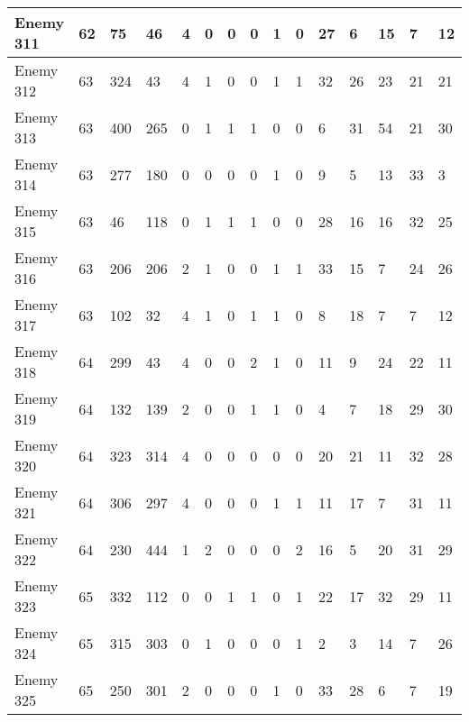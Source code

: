 \begin{sidewaystable}[!h]
{\begin{tabular}{|l|l|l|l|l|l|l|l|l|l|l|l|l|l|l|}
			Enemy 311 & 62 & 75 & 46 & 4 & 0 & 0 & 0 & 1 & 0 & 27 & 6 & 15 & 7 & 12 \\ \hline
			Enemy 312 & 63 & 324 & 43 & 4 & 1 & 0 & 0 & 1 & 1 & 32 & 26 & 23 & 21 & 21 \\ \hline
			Enemy 313 & 63 & 400 & 265 & 0 & 1 & 1 & 1 & 0 & 0 & 6 & 31 & 54 & 21 & 30 \\ \hline
			Enemy 314 & 63 & 277 & 180 & 0 & 0 & 0 & 0 & 1 & 0 & 9 & 5 & 13 & 33 & 3 \\ \hline
			Enemy 315 & 63 & 46 & 118 & 0 & 1 & 1 & 1 & 0 & 0 & 28 & 16 & 16 & 32 & 25 \\ \hline
			Enemy 316 & 63 & 206 & 206 & 2 & 1 & 0 & 0 & 1 & 1 & 33 & 15 & 7 & 24 & 26 \\ \hline
			Enemy 317 & 63 & 102 & 32 & 4 & 1 & 0 & 1 & 1 & 0 & 8 & 18 & 7 & 7 & 12 \\ \hline
			Enemy 318 & 64 & 299 & 43 & 4 & 0 & 0 & 2 & 1 & 0 & 11 & 9 & 24 & 22 & 11 \\ \hline
			Enemy 319 & 64 & 132 & 139 & 2 & 0 & 0 & 1 & 1 & 0 & 4 & 7 & 18 & 29 & 30 \\ \hline
			Enemy 320 & 64 & 323 & 314 & 4 & 0 & 0 & 0 & 0 & 0 & 20 & 21 & 11 & 32 & 28 \\ \hline
			Enemy 321 & 64 & 306 & 297 & 4 & 0 & 0 & 0 & 1 & 1 & 11 & 17 & 7 & 31 & 11 \\ \hline
			Enemy 322 & 64 & 230 & 444 & 1 & 2 & 0 & 0 & 0 & 2 & 16 & 5 & 20 & 31 & 29 \\ \hline
			Enemy 323 & 65 & 332 & 112 & 0 & 0 & 1 & 1 & 0 & 1 & 22 & 17 & 32 & 29 & 11 \\ \hline
			Enemy 324 & 65 & 315 & 303 & 0 & 1 & 0 & 0 & 0 & 1 & 2 & 3 & 14 & 7 & 26 \\ \hline
			Enemy 325 & 65 & 250 & 301 & 2 & 0 & 0 & 0 & 1 & 0 & 33 & 28 & 6 & 7 & 19 \\ \hline
		\end{tabular}%
	}
\end{sidewaystable}
\clearpage


